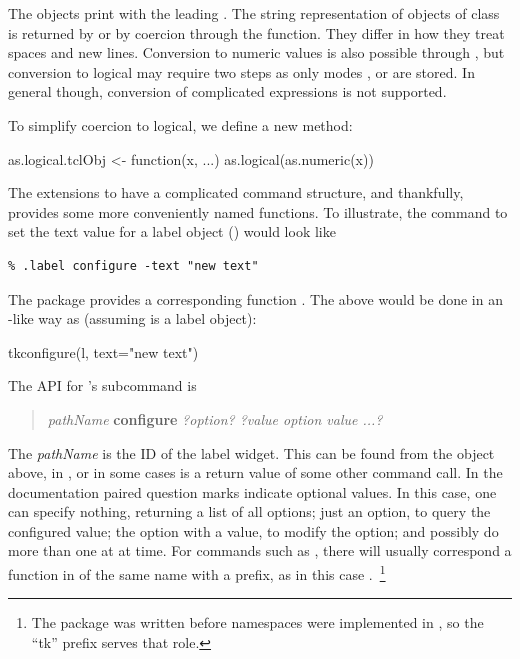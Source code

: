 The  objects print with the leading . The string representation
of objects of class  is returned by 
or by coercion through the  function. They
differ in how they treat spaces and new lines.  Conversion to numeric
values is also possible through , but conversion to
logical may require two steps as only modes ,
 or  are stored. In general though,
conversion of complicated \TCL\/ expressions is not supported.

To simplify coercion to logical, we define a new method:
\begin{Schunk}
\begin{Sinput}
 as.logical.tclObj <- function(x, ...) as.logical(as.numeric(x))
\end{Sinput}
\end{Schunk}


The \TK\/ extensions to \TCL\/ have a complicated command structure,
and thankfully,  provides some more conveniently named
functions. To illustrate, the \TCL\/ command to set the text value for
a label object () would look like
\begin{verbatim}
% .label configure -text "new text"
\end{verbatim}
The  package provides a corresponding function
. The above would be done in an \R-like way as (assuming  is a
label object):


\begin{Schunk}
\begin{Sinput}
 tkconfigure(l, text="new text")
\end{Sinput}
\end{Schunk}




The \TK\/ API for 's  subcommand is

\begin{quotation}
  \textit{pathName} \textbf{configure} \textit{?option? ?value option value ...?}
\end{quotation}

The \textit{pathName} is the ID of the label widget. This can be found
from the object  above, in , or in some cases is a
return value of some other command call.  In the \TK\/ documentation
paired question marks indicate optional values. In this case, one can
specify nothing, returning a list of all options; just an option, to
query the configured value; the option with a value, to modify the
option; and possibly do more than one at at time.  For commands such
as , there will usually correspond a function in
\R\/ of the same name with a  prefix, as in this case
.~\footnote{The package  was written before
namespaces were implemented in \R, so the ``tk'' prefix serves that role.}

